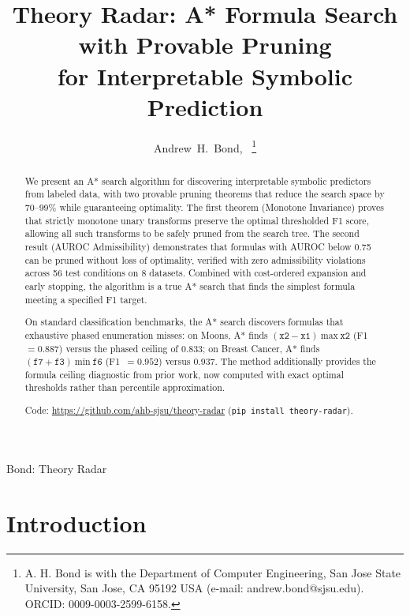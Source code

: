 \documentclass[journal]{IEEEtran}
\begin{document}
\title{Theory Radar: A* Formula Search with Provable Pruning\\for Interpretable Symbolic Prediction}

\author{Andrew~H.~Bond,~
\thanks{A. H. Bond is with the Department of Computer Engineering,
San Jose State University, San Jose, CA 95192 USA
(e-mail: andrew.bond@sjsu.edu). ORCID: 0009-0003-2599-6158.}
}

{Bond: Theory Radar}

\maketitle

\begin{abstract}
We present an A* search algorithm for discovering interpretable
symbolic predictors from labeled data, with two provable pruning
theorems that reduce the search space by 70--99\% while guaranteeing
optimality. The first theorem (Monotone Invariance) proves that
strictly monotone unary transforms preserve the optimal thresholded
F1 score, allowing all such transforms to be safely pruned from the
search tree. The second result (AUROC Admissibility) demonstrates
that formulas with AUROC below 0.75 can be pruned without loss of
optimality, verified with zero admissibility violations across 56
test conditions on 8 datasets. Combined with cost-ordered expansion
and early stopping, the algorithm is a true A* search that finds
the simplest formula meeting a specified F1 target.

On standard classification benchmarks, the A* search discovers
formulas that exhaustive phased enumeration misses: on Moons,
A* finds $(\texttt{x2}-\texttt{x1})~\mathrm{max}~\texttt{x2}$
(F1~$=0.887$) versus the phased ceiling of $0.833$; on Breast Cancer,
A* finds $(\texttt{f7}+\texttt{f3})~\mathrm{min}~\texttt{f6}$
(F1~$=0.952$) versus $0.937$. The method additionally provides
the formula ceiling diagnostic from prior work, now computed with
exact optimal thresholds rather than percentile approximation.

Code: \url{https://github.com/ahb-sjsu/theory-radar}
(\texttt{pip install theory-radar}).
\end{abstract}

\section{Introduction}
\end{document}
